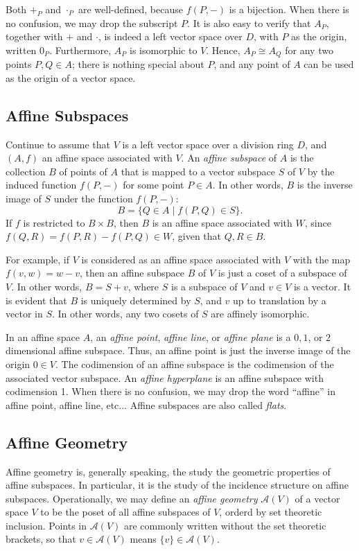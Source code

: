 \documentclass[12pt]{article}
\begin{document}
Both $+_P$ and $\cdot_P$ are well-defined, because $f(P,-)$ is a bijection.  When there is no confusion, we may drop the subscript $P$.  It is also easy to verify that $A_P$, together with $+$ and $\cdot$, is indeed a left vector space over $D$, with $P$ as the origin, written $0_P$.  Furthermore, $A_P$ is isomorphic to $V$.  Hence, $A_P\cong A_Q$ for any two points $P,Q\in A$; there is nothing special about $P$, and any point of $A$ can be used as the origin of a vector space.

\subsection*{Affine Subspaces}
Continue to assume that $V$ is a left vector space over a division ring $D$, and $(A,f)$ an affine space associated with $V$.  An \emph{affine subspace} of $A$ is the collection $B$ of points of $A$ that is mapped to a vector subspace $S$ of $V$ by the induced function $f(P,-)$ for some point $P\in A$.  In other words, $B$ is the inverse image of $S$ under the function $f(P,-)$: $$B = \lbrace Q \in A\mid f(P,Q)\in S\rbrace.$$  If $f$ is restricted to $B\times B$, then $B$ is an affine space associated with $W$, since $f(Q,R)=f(P,R)-f(P,Q)\in W$, given that $Q,R\in B$.

For example, if $V$ is considered as an affine space associated with $V$ with the map $f(v,w)=w-v$, then an affine subspace $B$ of $V$ is just a coset of a subspace of $V$.  In other words, $B=S+v$, where $S$ is a subspace of $V$ and $v\in V$ is a vector.  It is evident that $B$ is uniquely determined by $S$, and $v$ up to translation by a vector in $S$.  In other words, any two cosets of $S$ are affinely isomorphic.

In an affine space $A$, an \emph{affine point}, \emph{affine line}, or \emph{affine plane} is a $0,1$, or $2$ dimensional affine subspace.  Thus, an affine point is just the inverse image of the origin $0\in V$.  The codimension of an affine subspace is the codimension of the associated vector subspace.  An \emph{affine hyperplane} is an affine subspace with codimension 1.  When there is no confusion, we may drop the word ``affine'' in affine point, affine line, etc... Affine subspaces are also called \emph{flats}.

\subsection*{Affine Geometry}

Affine geometry is, generally speaking, the study the geometric properties of affine subspaces.  In particular, it is the study of the incidence structure on affine subspaces.  Operationally, we may define an \emph{affine geometry} $\mathcal{A}(V)$ of a vector space $V$ to be the poset of all affine subspaces of $V$, orderd by set theoretic inclusion.  Points in $\mathcal{A}(V)$ are commonly written without the set theoretic brackets, so that $v\in\mathcal{A}(V)$ means $\lbrace v\rbrace \in\mathcal{A}(V)$.
\end{document}
